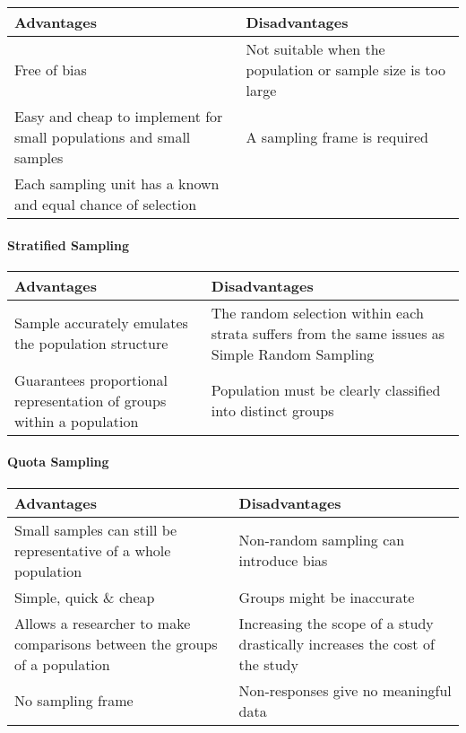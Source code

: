 \documentclass[
]{article}
\begin{document}
\begin{longtable}[]{@{}
  >{\raggedright\arraybackslash}p{}
  >{\raggedright\arraybackslash}p{}@{}}
\toprule
Advantages & Disadvantages \\
\midrule
\endhead
Free of bias & Not suitable when the population or sample size is too
large \\
Easy and cheap to implement for small populations and small samples & A
sampling frame is required \\
Each sampling unit has a known and equal chance of selection & \\
\bottomrule
\end{longtable}

\hypertarget{stratified-sampling-1}{%
\paragraph{Stratified Sampling}\label{stratified-sampling-1}}

\begin{longtable}[]{@{}
  >{\raggedright\arraybackslash}p{}
  >{\raggedright\arraybackslash}p{}@{}}
\toprule
Advantages & Disadvantages \\
\midrule
\endhead
Sample accurately emulates the population structure & The random
selection within each strata suffers from the same issues as Simple
Random Sampling \\
Guarantees proportional representation of groups within a population &
Population must be clearly classified into distinct groups \\
\bottomrule
\end{longtable}

\hypertarget{quota-sampling-1}{%
\paragraph{Quota Sampling}\label{quota-sampling-1}}

\begin{longtable}[]{@{}
  >{\raggedright\arraybackslash}p{}
  >{\raggedright\arraybackslash}p{}@{}}
\toprule
Advantages & Disadvantages \\
\midrule
\endhead
Small samples can still be representative of a whole population &
Non-random sampling can introduce bias \\
Simple, quick \& cheap & Groups might be inaccurate \\
Allows a researcher to make comparisons between the groups of a
population & Increasing the scope of a study drastically increases the
cost of the study \\
No sampling frame & Non-responses give no meaningful data \\
\bottomrule
\end{longtable}
\end{document}
